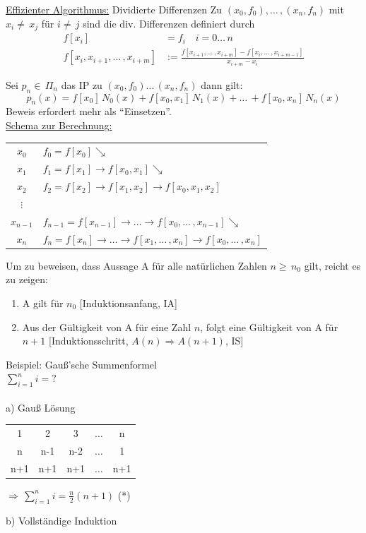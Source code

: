 \underline{Effizienter Algorithmus:} Dividierte Differenzen
Zu $(x_0,f_0),\ldots\,,(x_n,f_n)$ mit $x_i\neq\,x_j$ für $i\neq\,j$ sind die div. Differenzen definiert durch
\begin{align*}
f[x_i] &= f_i \quad i=0\ldots\,n\\
f[x_i,x_{i+1},\ldots\,,x_{i+m}] &:= \frac{f[x_{i+1},\ldots\,,x_{i+m}]-f[x_{i},\ldots\,,x_{i+m-1}]}{x_{i+m}-x_i}
\end{align*}

Sei $p_n\in\,\Pi_n$ das IP zu $(x_0,f_0)\ldots\,(x_n,f_n)$ dann gilt:
\begin{equation*}
p_n(x) = f[x_0]\,N_0(x)+f[x_0,x_1]\,N_1(x)+\ldots\,+f[x_0,x_n]\,N_n(x)
\end{equation*}
Beweis erfordert mehr als "`Einsetzen"'. \\
\underline{Schema zur Berechnung:}

\begin{tabular}{c|l}
$x_0$ & $f_0 = f[x_0] \searrow$ \\
$x_1$ & $f_1 = f[x_1] \rightarrow f[x_0,x_1]  \searrow$ \\
$x_2$ & $f_2 = f[x_2] \rightarrow f[x_1,x_2] \rightarrow f[x_0,x_1,x_2]$\\
$\vdots$ &  \\
$x_{n-1}$ & $f_{n-1} = f[x_{n-1}] \rightarrow \ldots \rightarrow f[x_0,\ldots\,,x_{n-1}] \searrow$\\
$x_n$ & $f_n = f[x_n] \rightarrow \ldots \rightarrow f[x_1,\ldots\,,x_n] \rightarrow f[x_0,\ldots\,,x_n]$ \\
\end{tabular}

Um zu beweisen, dass Aussage A für alle natürlichen Zahlen $n\geq\,n_0$ gilt, reicht es zu zeigen:

\begin{enumerate}
	\item A gilt für $n_0$ [Induktionsanfang, IA] 
	\item Aus der Gültigkeit von A für eine Zahl $n$, folgt eine Gültigkeit von A für $n+1$ [Induktionsschritt, $A(n)\Rightarrow A(n+1)$, IS]
\end{enumerate}

Beispiel: Gauß'sche Summenformel\\
$\sum\limits_{i=1}^{n}{i}=?$\\\\
a) Gauß Lösung\\
\begin{center}
\begin{tabular}{c|c|c|c|c}
	1 & 2 & 3 & $\ldots$ & n \\
	n & n-1 & n-2 & $\ldots$ & 1 \\\hline
  n+1 & n+1 & n+1 & $\ldots$ & n+1
\end{tabular}
$\Rightarrow\,\sum\limits_{i=1}^{n}{i}=\frac{n}{2}(n+1)$ (*)\\
\end{center}
b) Vollständige Induktion

